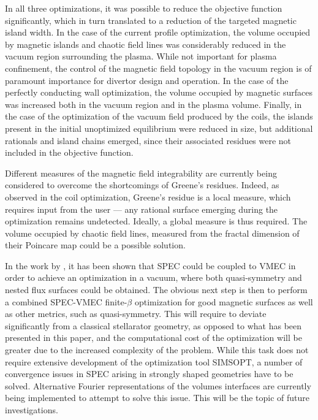 \documentclass[my_thesis.tex]{subfiles}
\begin{document}
In all three optimizations, it was possible to reduce the objective function significantly, which in turn translated to a reduction of the targeted magnetic island width. In the case of the current profile optimization, the volume occupied by magnetic islands and chaotic field lines was considerably reduced in the vacuum region surrounding the plasma. While not important for plasma confinement, the control of the magnetic field topology in the vacuum region is of paramount importance for divertor design and operation. In the case of the perfectly conducting wall optimization, the volume occupied by magnetic surfaces was increased both in the vacuum region and in the plasma volume. Finally, in the case of the optimization of the vacuum field produced by the coils, the islands present in the initial unoptimized equilibrium were reduced in size, but additional rationals and island chains emerged, since their associated residues were not included in the objective function. 

Different measures of the magnetic field integrability are currently being considered to overcome the shortcomings of Greene's residues. Indeed, as observed in the coil optimization, Greene's residue is a local measure, which requires input from the user --- any rational surface emerging during the optimization remains undetected. Ideally, a global measure is thus required. The volume occupied by chaotic field lines, measured from the fractal dimension of their Poincare map \cite{Loizu2017} could be a possible solution. 

In the work by \citet{Landreman2021a}, it has been shown that \ac{SPEC} could be coupled to VMEC in order to achieve an optimization in a vacuum, where both quasi-symmetry and nested flux surfaces could be obtained. The obvious next step is then to perform a combined \ac{SPEC}-VMEC finite-$\beta$ optimization for good magnetic surfaces as well as other metrics, such as quasi-symmetry. This will require to deviate significantly from a classical stellarator geometry, as opposed to what has been presented in this paper, and the computational cost of the optimization will be greater due to the increased complexity of the problem. While this task does not require extensive development of the optimization tool SIMSOPT, a number of convergence issues in SPEC arising in strongly shaped geometries have to be solved. Alternative Fourier representations of the volumes interfaces \citep{Henneberg2021} are currently being implemented to attempt to solve this issue. This will be the topic of future investigations.

%
\end{document}
